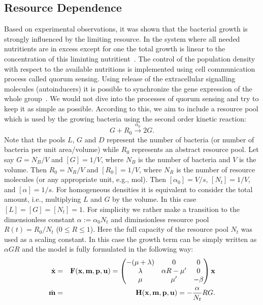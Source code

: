 \documentclass[10pt,A4paper]{article}
\begin{document}
\subsection{Resource Dependence}
Based on experimental observations, it was shown that the bacterial growth is strongly influenced by the limiting resource.
In the system where all needed nutritients are in excess except for one the total growth is linear to the concentration of this liminting nutritient~\cite{hibbing_bacterial_2010, monod_growth_1949}.
The control of the population density with respect to the available nutritions is implemented using cell communication process called quorum sensing. 
Using release of the extracellular signalling molecules (autoinducers) it is possible to synchronize the gene expression of the whole group~\cite{ng_bacterial_2009}.
We would not dive into the processes of quorum sensing and try to keep it as simple as possible.
According to this, we aim to include a resource pool which is used by the growing bacteria using the second order kinetic reaction:
\begin{equation}
    G + R_0  \stackrel{\alpha_0}{\longrightarrow} 2G.
\end{equation}
Note that the pools $L$, $G$ and $D$ represent the number of bacteria (or number of bacteria per unit area/volume) while $R_0$ represents an abstract resource pool. 
Let say $G=N_B/V$ and $[G]=1/V$, where $N_B$ is the number of bacteria and $V$ is the volume. 
Then $R_0=N_R/V$ and $[R_0]=1/V$, where $N_R$ is the number of resource molecules (or any appropriate unit, e.g., mol). 
Then $[\alpha_0]=V/s$, $[N_t]=1/V$, and $[\alpha]=1/s$. 
For homogeneous densities it is equivalent to consider the total amount, i.e., multiplying $L$ and $G$ by the volume. 
In this case $[L]=[G]=[N_t]=1$.
For simplicity we rather make a transition to the dimensionless constant $\alpha:=\alpha_0 N_t$ and diminsionless resource pool $R(t) = R_0 / N_t$ ($0 \leqslant R \leqslant 1$).
Here the full capacity of the resource pool $N_t$ was used as a scaling constant.
In this case the growth term can be simply written as $\alpha G R$ and the model is fully formulated in the following way: 
\begin{eqnarray}
    \dot {\mathbf{x}}  &=& \mathbf{F}(\mathbf{x}, \mathbf{m}, \mathbf{p}, \mathbf{u}) = \begin{pmatrix}
        -(\mu + \lambda) & 0               & 0      \\
        \lambda          & \alpha R - \mu' & 0      \\
        \mu              & \mu'            & -\beta 
    \end{pmatrix} \mathbf{x}\\
    \dot {\mathbf{m}} &=& \mathbf{H} (\mathbf{x}, \mathbf{m}, \mathbf{p}, \mathbf{u}) = -\frac{\alpha}{N_t} R G.
\end{eqnarray}
\end{document}
